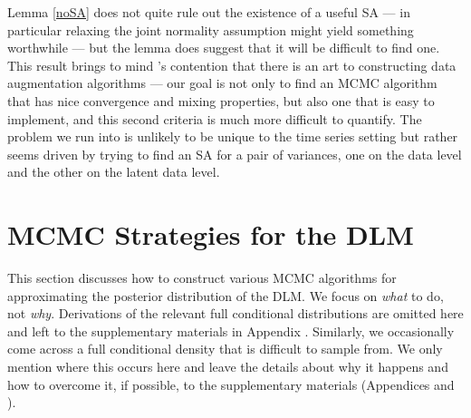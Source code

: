\documentclass[12pt]{article}
\begin{document}
Lemma \ref{noSA} does not quite rule out the existence of a useful SA --- in particular relaxing the joint normality assumption might yield something worthwhile --- but the lemma does suggest that it will be difficult to find one. This result brings to mind \citet{van2001art}'s contention that there is an art to constructing data augmentation algorithms --- our goal is not only to find an MCMC algorithm that has nice convergence and mixing properties, but also one that is easy to implement, and this second criteria is much more difficult to quantify. The problem we run into is unlikely to be unique to the time series setting but rather seems driven by trying to find an SA for a pair of variances, one on the data level and the other on the latent data level.

\section{MCMC Strategies for the DLM}\label{sec:Algs}

This section discusses how to construct various MCMC algorithms for approximating the posterior distribution of the DLM. We focus on {\it what} to do, not {\it why}. Derivations of the relevant full conditional distributions are omitted here and left to the supplementary materials in Appendix . Similarly, we occasionally come across a full conditional density that is difficult to sample from. We only mention where this occurs here and leave the details about why it happens and how to overcome it, if possible, to the supplementary materials (Appendices  and ).
\end{document}
